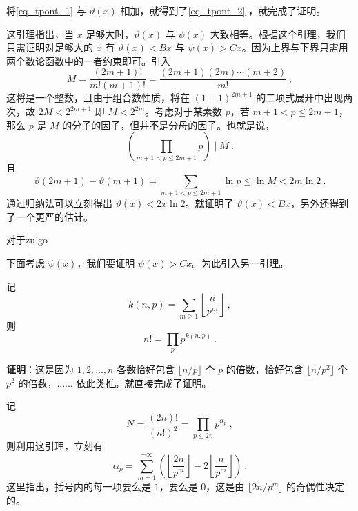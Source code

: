将\autoref{eq_tpont_1} 与 $\vartheta(x)$ 相加，就得到了\autoref{eq_tpont_2} ，就完成了证明。


这引理指出，当 $x$ 足够大时，$\vartheta(x)$ 与 $\psi(x)$ 大致相等。根据这个引理，我们只需证明对足够大的 $x$ 有 $\vartheta(x) < Bx$ 与 $\psi(x) > Cx$。因为上界与下界只需用两个数论函数中的一者约束即可。引入
\begin{equation}
M = \frac{(2m+1)!}{m! (m+1)!} = \frac{(2m+1)(2m)\cdots(m+2)}{m!} ~,
\end{equation}
这将是一个整数，且由于组合数性质，将在 $(1+1)^{2m+1}$ 的二项式展开中出现两次，故 $2M < 2^{2m+1}$ 即 $M < 2^{2m}$。考虑对于某素数 $p$，若 $m+1 < p \le 2m+1$，那么 $p$ 是 $M$ 的分子的因子，但并不是分母的因子。也就是说，
\begin{equation}
\left( \prod_{m+1 < p \le 2m+1} p \right) \mid M ~.
\end{equation}
且
\begin{equation}
\vartheta(2m+1) - \vartheta(m+1) = \sum_{m+1 < p \le 2m+1} \ln p \le \ln M < 2 m \ln 2 ~.
\end{equation}
通过归纳法可以立刻得出 $\vartheta(x) < 2x \ln 2$。就证明了 $\vartheta(x) < Bx$，另外还得到了一个更严的估计。
\begin{corollary}{}
对于zu'go
\end{corollary}

下面考虑 $\psi(x)$，我们要证明 $\psi(x) > Cx$。为此引入另一引理。
\begin{lemma}{}
记 
\begin{equation}
k(n, p) = \sum_{m\ge 1} \left\lfloor  \frac{n}{p^m} \right\rfloor ~,
\end{equation}
则
\begin{equation}
n! = \prod_p p^{k(n, p)} ~.
\end{equation}

\end{lemma}
\textbf{证明}：这是因为 $1, 2, \dots, n$ 各数恰好包含 $\lfloor n/p \rfloor$ 个 $p$ 的倍数，恰好包含 $ \lfloor n/p^2 \rfloor$ 个 $p^2$ 的倍数，...... 依此类推。就直接完成了证明。 

记 
\begin{equation}
N = \frac{(2n)!}{(n!)^2} = \prod_{p \le 2n} p^{\alpha_p} ~,
\end{equation}
则利用这引理，立刻有
\begin{equation}\label{eq_tpont_4}
\alpha_p = \sum_{m=1}^{+\infty} \left( \left\lfloor \frac{2n}{p^m} \right\rfloor - 2  \left\lfloor \frac{n}{p^m} \right\rfloor\right) ~.
\end{equation}
这里指出，括号内的每一项要么是 $1$，要么是 $0$，这是由 $\lfloor 2n/p^m \rfloor$ 的奇偶性决定的。

